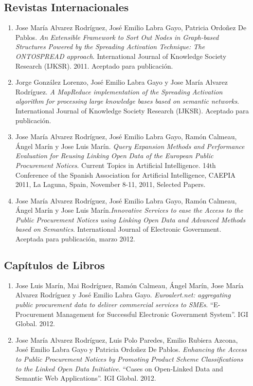 \subsection{Revistas Internacionales}
\begin{enumerate}
\item Jose María Alvarez Rodríguez, José Emilio Labra Gayo, Patricia Ordoñez De Pablos.\textit{ An Extensible Framework to Sort Out 
Nodes in Graph-based Structures Powered by the Spreading Activation Technique: The ONTOSPREAD approach}. 
International Journal of Knowledge Society Research (IJKSR). 2011. Aceptado para publicación.
\item Jorge González Lorenzo, José Emilio Labra Gayo y Jose María Alvarez Rodríguez. \textit{A MapReduce implementation of the Spreading Activation 
algorithm for processing large knowledge bases based on semantic networks}. International Journal of Knowledge Society Research (IJKSR). Aceptado para publicación. 
\item Jose María Alvarez Rodríguez, José Emilio Labra Gayo, Ramón Calmeau, Ángel Marín y Jose Luis Marín. \textit{Query Expansion Methods and Performance Evaluation for Reusing Linking 
Open Data of the European Public Procurement Notices}. Current Topics in Artificial Intelligence. 14th Conference of 
the Spanish Association for Artificial Intelligence, CAEPIA 2011, La Laguna, Spain, November 8-11, 2011, Selected Papers.
\item Jose María Alvarez Rodríguez, José Emilio Labra Gayo, Ramón Calmeau, Ángel Marín y Jose Luis Marín.\textit{Innovative Services to ease the Access to the Public Procurement Notices 
using Linking Open Data and Advanced Methods based on Semantics}. International Journal of Electronic Government. Aceptada para publicación, marzo 2012.
\end{enumerate}


\subsection{Capítulos de Libros}
\begin{enumerate}
\item Jose Luis Marín, Mai Rodríguez, Ramón Calmeau, Ángel Marín, Jose María Alvarez Rodríguez y José Emilio Labra Gayo.
 \textit{Euroalert.net: aggregating public procurement data to deliver commercial services to SMEs}. 
``E-Procurement Management for Successful Electronic Government System''. IGI Global. 2012.

\item Jose María Alvarez Rodríguez, Luis Polo Paredes, Emilio Rubiera Azcona, José Emilio Labra Gayo y Patricia Ordoñez De Pablos.
 \textit{Enhancing the Access to Public Procurement Notices by Promoting Product Scheme Classifications to the 
Linked Open Data Initiative}. ``Cases on Open-Linked Data and Semantic Web Applications''. IGI Global. 2012.
\end{enumerate}
